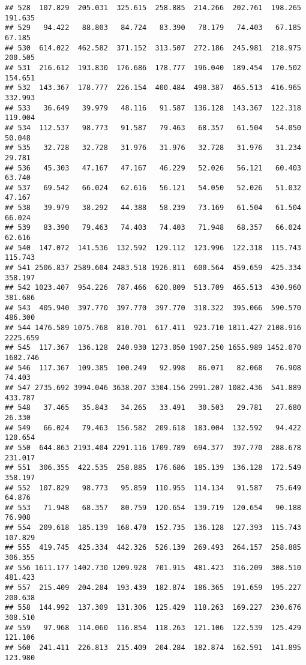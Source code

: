 \documentclass[
]{article}
\begin{document}
\begin{verbatim}
## 528  107.829  205.031  325.615  258.885  214.266  202.761  198.265  191.635
## 529   94.422   88.803   84.724   83.390   78.179   74.403   67.185   67.185
## 530  614.022  462.582  371.152  313.507  272.186  245.981  218.975  200.505
## 531  216.612  193.830  176.686  178.777  196.040  189.454  170.502  154.651
## 532  143.367  178.777  226.154  400.484  498.387  465.513  416.965  332.993
## 533   36.649   39.979   48.116   91.587  136.128  143.367  122.318  119.004
## 534  112.537   98.773   91.587   79.463   68.357   61.504   54.050   50.048
## 535   32.728   32.728   31.976   31.976   32.728   31.976   31.234   29.781
## 536   45.303   47.167   47.167   46.229   52.026   56.121   60.403   63.740
## 537   69.542   66.024   62.616   56.121   54.050   52.026   51.032   47.167
## 538   39.979   38.292   44.388   58.239   73.169   61.504   61.504   66.024
## 539   83.390   79.463   74.403   74.403   71.948   68.357   66.024   62.616
## 540  147.072  141.536  132.592  129.112  123.996  122.318  115.743  115.743
## 541 2506.837 2589.604 2483.518 1926.811  600.564  459.659  425.334  358.197
## 542 1023.407  954.226  787.466  620.809  513.709  465.513  430.960  381.686
## 543  405.940  397.770  397.770  397.770  318.322  395.066  590.570  486.300
## 544 1476.589 1075.768  810.701  617.411  923.710 1811.427 2108.916 2225.659
## 545  117.367  136.128  240.930 1273.050 1907.250 1655.989 1452.070 1682.746
## 546  117.367  109.385  100.249   92.998   86.071   82.068   76.908   74.403
## 547 2735.692 3994.046 3638.207 3304.156 2991.207 1082.436  541.889  433.787
## 548   37.465   35.843   34.265   33.491   30.503   29.781   27.680   26.330
## 549   66.024   79.463  156.582  209.618  183.004  132.592   94.422  120.654
## 550  644.863 2193.404 2291.116 1709.789  694.377  397.770  288.678  231.017
## 551  306.355  422.535  258.885  176.686  185.139  136.128  172.549  358.197
## 552  107.829   98.773   95.859  110.955  114.134   91.587   75.649   64.876
## 553   71.948   68.357   80.759  120.654  139.719  120.654   90.188   76.908
## 554  209.618  185.139  168.470  152.735  136.128  127.393  115.743  107.829
## 555  419.745  425.334  442.326  526.139  269.493  264.157  258.885  306.355
## 556 1611.177 1402.730 1209.928  701.915  481.423  316.209  308.510  481.423
## 557  215.409  204.284  193.439  182.874  186.365  191.659  195.227  200.638
## 558  144.992  137.309  131.306  125.429  118.263  169.227  230.676  308.510
## 559   97.968  114.060  116.854  118.263  121.106  122.539  125.429  121.106
## 560  241.411  226.813  215.409  204.284  182.874  162.591  141.895  123.980

\end{verbatim}
\end{document}
